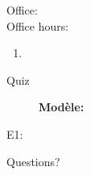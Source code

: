 \documentclass{beamer}
\subtitle[Solidarité et subjonctif]{La solidarité et... le subjonctif!}
\begin{document}
  \begin{frame}
    \titlepage
    \tiny{Office: \\
          Office hours: }
  \end{frame}

  \begin{frame}{}
    \begin{enumerate}
      \item 
    \end{enumerate}
  \end{frame}

  \begin{frame}{}
    \begin{center}
      \Large Quiz
    \end{center}
  \end{frame}

  \begin{frame}{}
    \begin{description}
      \item[] \textbf{Modèle:} \emph{}
      \item[E1:] 
    \end{description}
  \end{frame}

  \begin{frame}{}
    
  \end{frame}

  \begin{frame}{}
    \begin{center}
      \Large Questions?
    \end{center}
  \end{frame}
\end{document}
